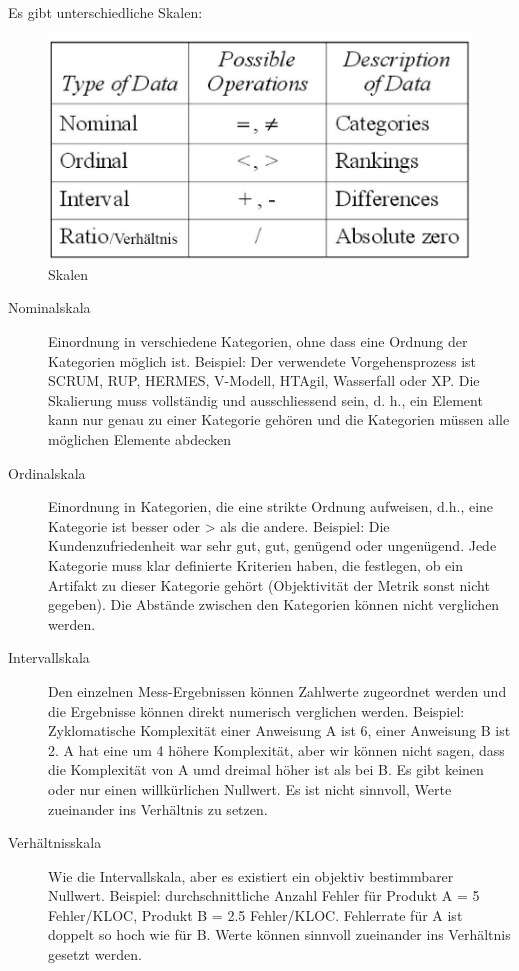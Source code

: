 Es gibt unterschiedliche Skalen:
\begin{figure}[h!]
\centering
\includegraphics[width=0.7\linewidth]{fig/software-quality-skalen}
\caption{Skalen}
\label{fig:software-quality-skalen}
\end{figure}

\begin{description}
	\item[Nominalskala] Einordnung in verschiedene Kategorien, ohne dass eine Ordnung der Kategorien möglich ist. Beispiel: Der verwendete Vorgehensprozess ist SCRUM, RUP, HERMES, V-Modell, HTAgil, Wasserfall oder XP. Die Skalierung muss vollständig und ausschliessend sein, d. h., ein Element kann nur genau zu einer Kategorie gehören und die Kategorien müssen alle möglichen Elemente abdecken
	
	\item[Ordinalskala] Einordnung in Kategorien, die eine strikte Ordnung aufweisen, d.h., eine Kategorie ist besser oder > als die andere. Beispiel: Die Kundenzufriedenheit war sehr gut, gut, genügend oder ungenügend. Jede Kategorie muss klar definierte Kriterien haben, die festlegen, ob ein Artifakt zu dieser Kategorie gehört (Objektivität der Metrik sonst nicht gegeben). Die Abstände zwischen den Kategorien können nicht verglichen werden.
	
	\item[Intervallskala] Den einzelnen Mess-Ergebnissen können Zahlwerte zugeordnet werden und die Ergebnisse können direkt numerisch verglichen werden. Beispiel: Zyklomatische Komplexität einer Anweisung A ist 6, einer Anweisung B ist 2. A hat eine um 4 höhere Komplexität, aber wir können nicht sagen, dass die Komplexität von A umd dreimal höher ist als bei B. Es gibt keinen oder nur einen willkürlichen Nullwert. Es ist nicht sinnvoll, Werte zueinander ins Verhältnis zu setzen.
	
	\item[Verhältnisskala] Wie die Intervallskala, aber es existiert ein objektiv bestimmbarer Nullwert. Beispiel: durchschnittliche Anzahl Fehler für Produkt A = 5 Fehler/KLOC, Produkt B = 2.5 Fehler/KLOC. Fehlerrate für A ist doppelt so hoch wie für B. Werte können sinnvoll zueinander ins Verhältnis gesetzt werden.
\end{description} 

